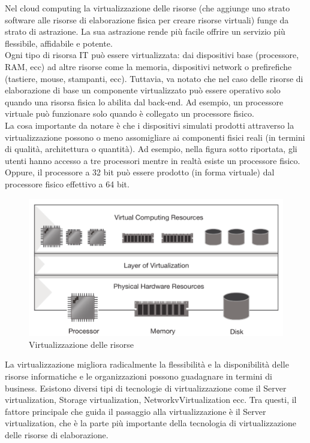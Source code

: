 \documentclass{article}
\begin{document}
Nel cloud computing la virtualizzazione delle risorse (che aggiunge uno strato software alle risorse di elaborazione fisica per creare risorse virtuali) funge da strato di astrazione. La sua astrazione rende più facile offrire un servizio più flessibile, affidabile e potente. \\
Ogni tipo di risorsa IT può essere virtualizzata: dai dispositivi base (processore, RAM, ecc) ad altre risorse come la memoria, dispositivi network o prefirefiche (tastiere, mouse, stampanti, ecc). Tuttavia, va notato che nel caso delle risorse di elaborazione di base un componente virtualizzato può essere operativo solo quando una risorsa fisica lo abilita dal back-end. Ad esempio, un processore virtuale può funzionare solo quando è collegato un processore fisico. \\
La cosa importante da notare è che i dispositivi simulati prodotti attraverso la virtualizzazione possono o meno assomigliare ai componenti fisici reali (in termini di qualità, architettura o quantità). Ad esempio, nella figura sotto riportata, gli utenti hanno accesso a tre processori mentre in realtà esiste un processore fisico. Oppure, il processore a 32 bit può essere prodotto (in forma virtuale) dal processore fisico effettivo a 64 bit.
\begin{figure}[H]
    \centering
    \includegraphics[scale=0.5]{img/resource virtualization.png}
    \caption{Virtualizzazione delle risorse}
\end{figure}\noindent
La virtualizzazione migliora radicalmente la flessibilità e la disponibilità delle risorse informatiche e le organizzazioni possono guadagnare in termini di business. Esistono diversi tipi di tecnologie di virtualizzazione come il Server virtualization, Storage virtualization, NetworkvVirtualization ecc. Tra questi, il fattore principale che guida il passaggio alla virtualizzazione è il Server virtualization, che è la parte più importante della tecnologia di virtualizzazione delle risorse di elaborazione. \\
\end{document}
